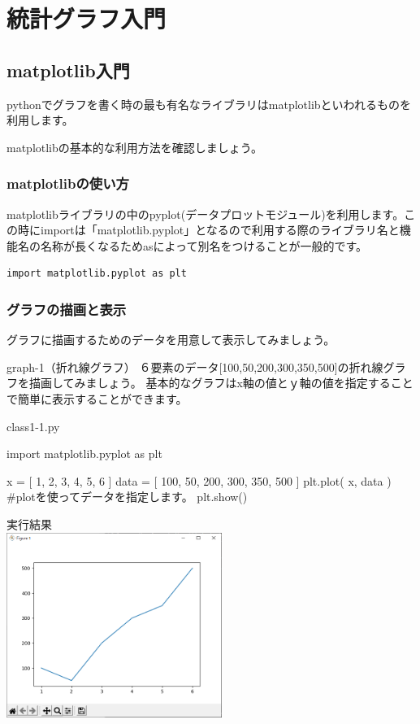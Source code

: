 \chapter{統計グラフ入門}


\section{matplotlib入門}
pythonでグラフを書く時の最も有名なライブラリはmatplotlibといわれるものを利用します。

matplotlibの基本的な利用方法を確認しましょう。

\subsection{matplotlibの使い方}
matplotlibライブラリの中のpyplot(データプロットモジュール)を利用します。この時にimportは「matplotlib.pyplot」となるので利用する際のライブラリ名と機能名の名称が長くなるためasによって別名をつけることが一般的です。

\begin{verbatim}
import matplotlib.pyplot as plt

\end{verbatim}


\subsection{グラフの描画と表示}
グラフに描画するためのデータを用意して表示してみましょう。


\begin{pabox}{graph-1（折れ線グラフ）}
６要素のデータ[100,50,200,300,350,500]の折れ線グラフを描画してみましょう。
基本的なグラフはx軸の値とｙ軸の値を指定することで簡単に表示することができます。
\begin{legbox}{class1-1.py}
\begin{listing}{1}
import matplotlib.pyplot as plt

x = [ 1, 2, 3, 4, 5, 6 ]
data = [ 100, 50, 200, 300, 350, 500 ]
plt.plot( x, data )
#plotを使ってデータを指定します。
plt.show()
\end{listing}


実行結果\\

\includegraphics[width=7cm]{images/graph1.png} 

\end{legbox}
\end{pabox}

